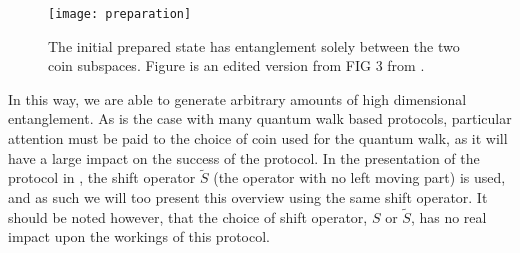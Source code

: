 \begin{figure}
    \centering
    \texttt{[image: preparation]}
    \caption{The initial prepared state has entanglement solely between the two coin subspaces. Figure is an edited version from FIG 3 from \cite{giordani2020}.}
    \label{fig:preparation}
\end{figure}

In this way, we are able to generate arbitrary amounts of high dimensional entanglement. 
As is the case with many quantum walk based protocols, particular attention must be paid to the choice of coin used for the quantum walk, as it will have a large impact on the success of the protocol.
In the presentation of the protocol in \cite{giordani2020}, the shift operator $\tilde{S}$ (the operator with no left moving part) is used, and as such we will too present this overview using the same shift operator. It should be noted however, that the choice of shift operator, $S$ or $\tilde{S}$, has no real impact upon the workings of this protocol.

